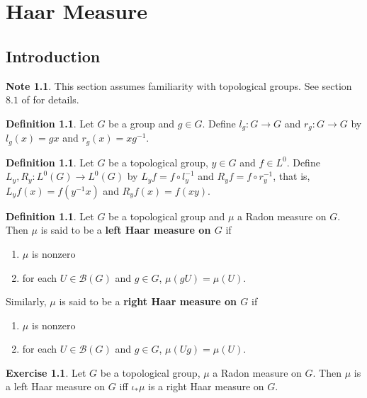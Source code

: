 \documentclass{book}
\theoremstyle{definition}
\newtheorem{defn}[definition]{Definition}
\newtheorem{note}[definition]{Note}
\newtheorem{ex}[definition]{Exercise}
\newcommand{\MB}{\mathcal{B}}
\newcommand{\lex}[1]{\label{ex:#1}}
\newcommand{\ld}[1]{\label{defn:#1}}
\DeclareMathOperator*{\0}{\mbf{0}}
\DeclareMathOperator*{\1}{\mbf{1}}
\begin{document}
	\newpage
	\chapter{Haar Measure}
	
	\section{Introduction}
	
	\begin{note}
	This section assumes familiarity with topological groups. See section $8.1$ of \cite{analysis} for details. 
	\end{note}

	\begin{defn} \ld{00000} 
		Let $G$ be a group and $g \in G$. Define $l_g:G \rightarrow G$ and $r_g:G \rightarrow G$ by $l_g(x) = gx$ and $r_g(x) = xg^{-1}$. 
	\end{defn}

	\begin{defn} \ld{00000} 
		Let $G$ be a topological group, $y \in G$ and $f \in L^0$.  Define $L_y, R_y: L^0(G) \rightarrow L^0(G)$ by $L_y f = f \circ l_y^{-1}$ and $R_y f = f \circ r_y^{-1}$, that is, $L_yf(x) = f(y^{-1}x)$ and $R_yf(x) = f(xy)$.
	\end{defn}
	
	\begin{defn} \ld{00000} 
		Let $G$ be a topological group and $\mu$ a Radon measure on $G$. Then $\mu$ is said to be a \textbf{left Haar measure on $G$} if 
		\begin{enumerate}
			\item $\mu$ is nonzero  
			\item for each $U \in \MB(G)$ and $g \in G$, $\mu(gU) = \mu(U)$.  
		\end{enumerate}
		Similarly, $\mu$ is said to be a \textbf{right Haar measure on $G$} if 
		\begin{enumerate}
			\item $\mu$ is nonzero  
			\item for each $U \in \MB(G)$ and $g \in G$, $\mu(Ug) = \mu(U)$.  
		\end{enumerate}
	\end{defn}
	
	\begin{ex} \lex{00000} 
		Let $G$ be a topological group, $\mu$ a Radon measure on $G$. Then $\mu$ is a left Haar measure on $G$ iff $\iota_*\mu$ is a right Haar measure on $G$. 
	\end{ex}
	
\end{document}
